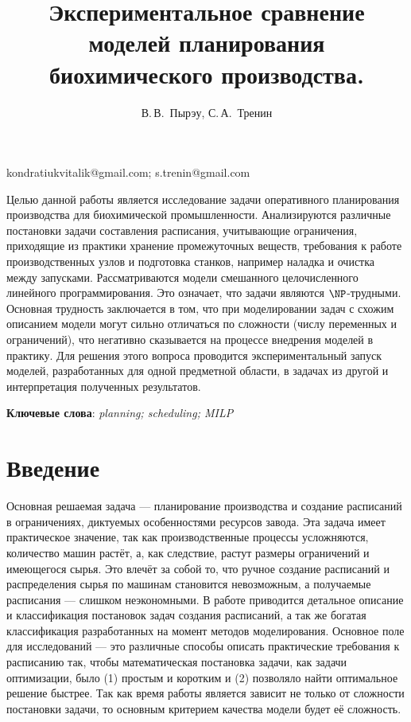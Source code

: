 \documentclass[12pt, twoside]{article}
\theoremstyle{definition}
\begin{document}
\title
    [Экспериментальное сравнение моделей планирования биохимического производства.] %
    {Экспериментальное сравнение моделей планирования биохимического производства.}
\author
    [В.\,В.~Пырэу, С.\,А.~Тренин] %
    {В.\,В.~Пырэу, С.\,А.~Тренин} %
\email
    {kondratiukvitalik@gmail.com; s.trenin@gmail.com}
\abstract
    {Целью данной работы является исследование задачи оперативного планирования производства для биохимической промышленности. Анализируются различные постановки задачи составления расписания, учитывающие ограничения, приходящие из практики хранение промежуточных веществ, требования к работе производственных узлов и подготовка станков, например наладка и очистка между запусками. Рассматриваются модели смешанного целочисленного линейного программирования. Это означает, что задачи являются $\NP$-трудными. Основная трудность заключается в том, что при моделировании задач с схожим описанием модели могут сильно отличаться по сложности (числу переменных и ограничений), что негативно сказывается на процессе внедрения моделей в практику. Для решения этого вопроса проводится экспериментальный запуск моделей, разработанных для одной предметной области, в задачах из другой и интерпретация полученных результатов.
    
    
\bigskip
\noindent
\textbf{Ключевые слова}: \emph {planning; scheduling; MILP}
}

\doi{}
\receivedRus{}
\receivedEng{}

\maketitle
\linenumbers

\section{Введение}
Основная решаемая задача --- планирование производства и создание расписаний в ограничениях, диктуемых особенностями ресурсов завода. Эта задача имеет практическое значение, так как производственные процессы усложняются, количество машин растёт, а, как следствие, растут размеры ограничений и имеющегося сырья. Это влечёт за собой то, что ручное создание расписаний и распределения сырья по машинам становится невозможным, а получаемые расписания --- слишком неэкономными. В работе \cite{reallife} приводится детальное описание и классификация постановок задач создания расписаний, а так же богатая классификация разработанных на момент методов моделирования. Основное поле для исследований --- это различные способы описать практические требования к расписанию так, чтобы математическая постановка задачи, как задачи оптимизации, было (1) простым и коротким и (2) позволяло найти оптимальное решение быстрее. Так как время работы является зависит не только от сложности постановки задачи, то основным критерием качества модели будет её сложность.
\end{document}
